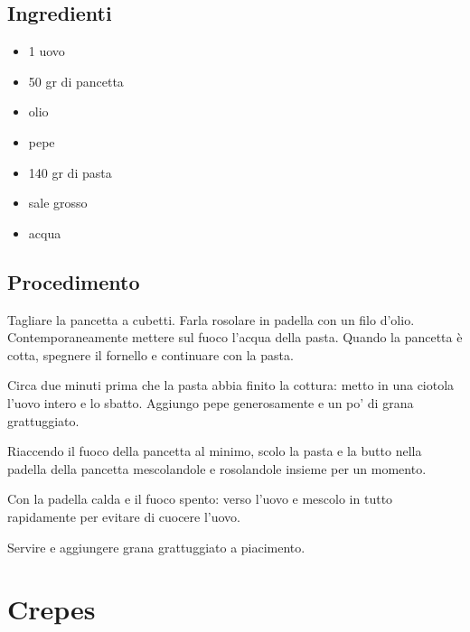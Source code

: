 \documentclass[12pt]{article}
\begin{document}
\bigskip
\bigskip

\begin{multicols}{2}
\subsection*{Ingredienti}
\begin{itemize}
	\item 1 uovo
	\item 50 gr di pancetta
	\item olio
	\item pepe
	\item 140 gr di pasta
	\item sale grosso
	\item acqua
\end{itemize}

\vspace*{\fill}

\columnbreak
\subsection*{Procedimento}

Tagliare la pancetta a cubetti. Farla rosolare in padella con un filo d'olio.
Contemporaneamente mettere sul fuoco l'acqua della pasta.
Quando la pancetta è cotta, spegnere il fornello e continuare con la pasta.
\medskip

Circa due minuti prima che la pasta abbia finito la cottura: metto in una ciotola 
l'uovo intero e lo sbatto. Aggiungo pepe generosamente e un po' di grana grattuggiato.
\medskip

Riaccendo il fuoco della pancetta al minimo, scolo la pasta e la butto nella padella della 
pancetta mescolandole e rosolandole insieme per un momento.
\medskip

Con la padella calda e il fuoco spento: verso l'uovo e mescolo in tutto rapidamente
per evitare di cuocere l'uovo.
\medskip

Servire e aggiungere grana grattuggiato a piacimento.

\end{multicols}

\newpage



\section{Crepes}
\end{document}
